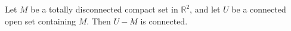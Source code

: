 Let $M$ be a totally disconnected compact set in $\mathbb{R}^2$, and let $U$ be a connected open set containing $M$. Then $U - M$ is connected.
